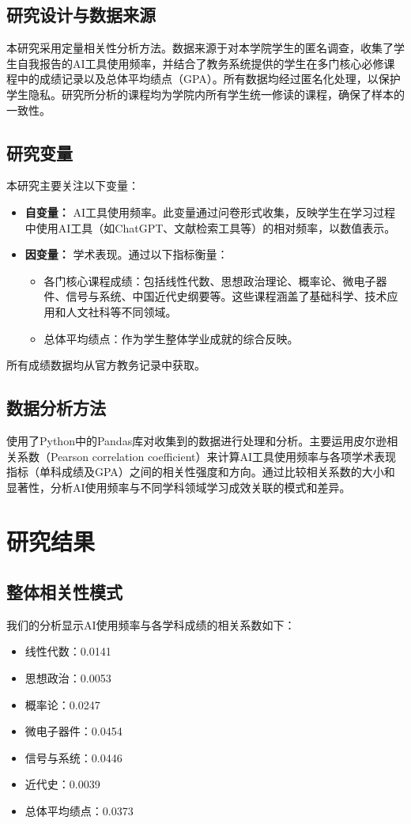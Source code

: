 \documentclass[a4paper,12pt]{article}
\begin{document}
\subsection{研究设计与数据来源}
本研究采用定量相关性分析方法。数据来源于对本学院学生的匿名调查，收集了学生自我报告的AI工具使用频率，并结合了教务系统提供的学生在多门核心必修课程中的成绩记录以及总体平均绩点（GPA）。所有数据均经过匿名化处理，以保护学生隐私。研究所分析的课程均为学院内所有学生统一修读的课程，确保了样本的一致性。

\subsection{研究变量}
本研究主要关注以下变量：
\begin{itemize}
    \item \textbf{自变量：} AI工具使用频率。此变量通过问卷形式收集，反映学生在学习过程中使用AI工具（如ChatGPT、文献检索工具等）的相对频率，以数值表示。
    \item \textbf{因变量：} 学术表现。通过以下指标衡量：
    \begin{itemize}
        \item 各门核心课程成绩：包括线性代数、思想政治理论、概率论、微电子器件、信号与系统、中国近代史纲要等。这些课程涵盖了基础科学、技术应用和人文社科等不同领域。
        \item 总体平均绩点：作为学生整体学业成就的综合反映。
    \end{itemize}
\end{itemize}
所有成绩数据均从官方教务记录中获取。

\subsection{数据分析方法}
使用了Python中的Pandas库对收集到的数据进行处理和分析。主要运用皮尔逊相关系数（Pearson correlation coefficient）来计算AI工具使用频率与各项学术表现指标（单科成绩及GPA）之间的相关性强度和方向。通过比较相关系数的大小和显著性，分析AI使用频率与不同学科领域学习成效关联的模式和差异。

\section{研究结果}
\subsection{整体相关性模式}
我们的分析显示AI使用频率与各学科成绩的相关系数如下：
\begin{itemize}
    \item 线性代数：0.0141
    \item 思想政治：0.0053
    \item 概率论：0.0247
    \item 微电子器件：0.0454
    \item 信号与系统：0.0446
    \item 近代史：0.0039
    \item 总体平均绩点：0.0373
\end{itemize}
\end{document}
